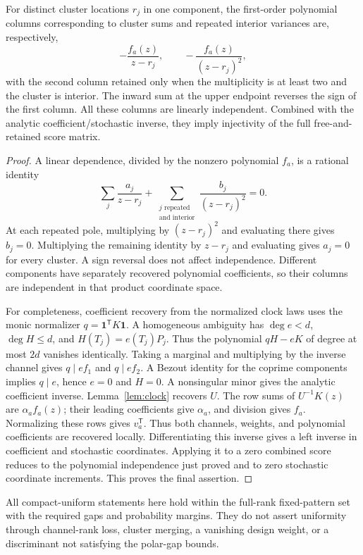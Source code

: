 \begin{lemma}\label{lem:fractions}
For distinct cluster locations $r_j$ in one component, the first-order polynomial columns corresponding to cluster sums and repeated interior variances are, respectively,
\[
 -\frac{f_a(z)}{z-r_j},\qquad -\frac{f_a(z)}{(z-r_j)^2},
\]
with the second column retained only when the multiplicity is at least two and the cluster is interior. The inward sum at the upper endpoint reverses the sign of the first column. All these columns are linearly independent. Combined with the analytic coefficient/stochastic inverse, they imply injectivity of the full free-and-retained score matrix.
\end{lemma}
\begin{proof}
A linear dependence, divided by the nonzero polynomial $f_a$, is a rational identity
\[
 \sum_j\frac{a_j}{z-r_j}
 +\sum_{\substack{j\text{ repeated}\\\text{and interior}}}
 \frac{b_j}{(z-r_j)^2}=0.
\]
At each repeated pole, multiplying by $(z-r_j)^2$ and evaluating there gives $b_j=0$. Multiplying the remaining identity by $z-r_j$ and evaluating gives $a_j=0$ for every cluster. A sign reversal does not affect independence. Different components have separately recovered polynomial coefficients, so their columns are independent in that product coordinate space.

For completeness, coefficient recovery from the normalized clock laws uses the monic normalizer $q=\mathbf1^{\mathsf T}K\mathbf1$. A homogeneous ambiguity has $\deg e<d$, $\deg H\le d$, and $H(T_j)=e(T_j)P_j$. Thus the polynomial $qH-eK$ of degree at most $2d$ vanishes identically. Taking a marginal and multiplying by the inverse channel gives $q\mid ef_1$ and $q\mid ef_2$. A Bezout identity for the coprime components implies $q\mid e$, hence $e=0$ and $H=0$. A nonsingular minor gives the analytic coefficient inverse. Lemma~\ref{lem:clock} recovers $U$. The row sums of $U^{-1}K(z)$ are $\alpha_a f_a(z)$; their leading coefficients give $\alpha_a$, and division gives $f_a$. Normalizing these rows gives $v_a^{\mathsf T}$. Thus both channels, weights, and polynomial coefficients are recovered locally. Differentiating this inverse gives a left inverse in coefficient and stochastic coordinates. Applying it to a zero combined score reduces to the polynomial independence just proved and to zero stochastic coordinate increments. This proves the final assertion.
\end{proof}
All compact-uniform statements here hold within the full-rank fixed-pattern set with the required gaps and probability margins. They do not assert uniformity through channel-rank loss, cluster merging, a vanishing design weight, or a discriminant not satisfying the polar-gap bounds.

